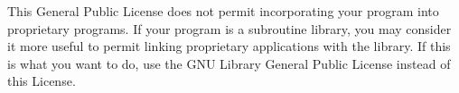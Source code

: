 	
	This General Public License does not permit incorporating your program
	into proprietary programs.  If your program is a subroutine library, you
	may consider it more useful to permit linking proprietary applications
	with the library.  If this is what you want to do, use the GNU Library
	General Public License instead of this License.
	

